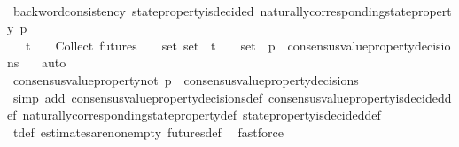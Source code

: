 \begin{isabellebody}
\ \ \ \ \ \ \isanewline
\ \ \ \ \ \ \isamarkupfalse%
\ backword{\isacharunderscore}consistency\ {\isacartoucheopen}state{\isacharunderscore}property{\isacharunderscore}is{\isacharunderscore}decided\ {\isacharparenleft}naturally{\isacharunderscore}corresponding{\isacharunderscore}state{\isacharunderscore}property\ p{\isacharcomma}\ {\isasymsigma}{\isacharprime}{\isacharprime}{\isacharparenright}{\isacartoucheclose}\isanewline
\ \ \ \ \ \ \isamarkupfalse%
\ {\isacartoucheopen}{\isasymsigma}{\isacharprime}{\isacharprime}\ {\isasymin}\ {\isasymSigma}t\ {\isasymand}\ {\isasymsigma}{\isacharprime}{\isacharprime}\ {\isasymin}\ {\isasymInter}{\isacharunderscore}Collect\ {\isacharparenleft}futures\ {\isasymsigma}{\isacharparenright}\ {\isacharparenleft}{\isasymsigma}\ {\isasymin}\ {\isasymsigma}{\isacharunderscore}set{\isacharparenright}{\isacartoucheclose}\ {\isacartoucheopen}{\isasymsigma}{\isacharunderscore}set\ {\isasymsubseteq}\ {\isasymSigma}t{\isacartoucheclose}\ {\isacartoucheopen}{\isacharbraceleft}{\isasymsigma}{\isacharcomma}\ {\isasymsigma}{\isacharprime}{\isacharbraceright}\ {\isasymsubseteq}\ {\isasymsigma}{\isacharunderscore}set\ {\isasymand}\ p\ {\isasymin}\ consensus{\isacharunderscore}value{\isacharunderscore}property{\isacharunderscore}decisions\ {\isasymsigma}{\isacartoucheclose}\ \isamarkupfalse%
\ auto\ \ \isanewline
\ \ \isamarkupfalse%
\ \isamarkupfalse%
\ {\isachardoublequoteopen}consensus{\isacharunderscore}value{\isacharunderscore}property{\isacharunderscore}not\ p\ {\isasymnotin}\ consensus{\isacharunderscore}value{\isacharunderscore}property{\isacharunderscore}decisions\ {\isasymsigma}{\isacharprime}{\isachardoublequoteclose}\isanewline
\ \ \ \ \isamarkupfalse%
\ {\isacharparenleft}simp\ add{\isacharcolon}\ consensus{\isacharunderscore}value{\isacharunderscore}property{\isacharunderscore}decisions{\isacharunderscore}def\ consensus{\isacharunderscore}value{\isacharunderscore}property{\isacharunderscore}is{\isacharunderscore}decided{\isacharunderscore}def\ naturally{\isacharunderscore}corresponding{\isacharunderscore}state{\isacharunderscore}property{\isacharunderscore}def\ state{\isacharunderscore}property{\isacharunderscore}is{\isacharunderscore}decided{\isacharunderscore}def{\isacharparenright}\isanewline
\ \ \ \ \isamarkupfalse%
\ {\isasymSigma}t{\isacharunderscore}def\ estimates{\isacharunderscore}are{\isacharunderscore}non{\isacharunderscore}empty\ futures{\isacharunderscore}def\ \isamarkupfalse%
\ fastforce\ \ \ \isanewline
{}\isamarkupfalse%
%
\endisatagproof
{\isafoldproof}%
%
\isadelimproof
\isanewline
%
\endisadelimproof
%
\isadelimtheory
\isanewline
%
\endisadelimtheory
%
\isatagtheory
{}\isamarkupfalse%
%
\endisatagtheory
{\isafoldtheory}%
%
\isadelimtheory
%
\endisadelimtheory
%
\end{isabellebody}%
